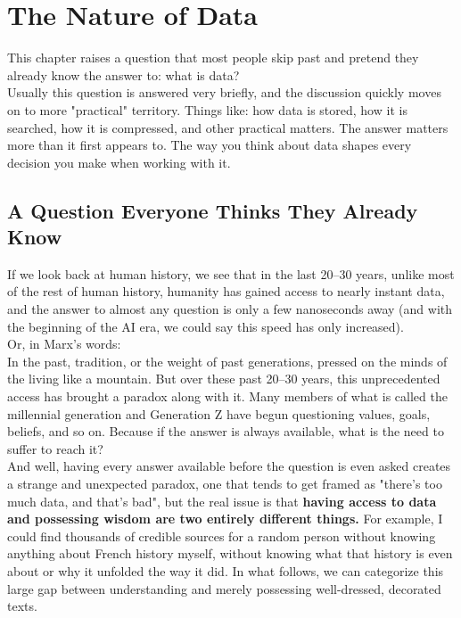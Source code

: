 \chapter{The Nature of Data}
\label{ch:nature-of-data}

This chapter raises a question that most people skip past and pretend they already know the answer to: what is data?\\
Usually this question is answered very briefly, and the discussion quickly moves on to more "practical" territory. Things like:
how data is stored, how it is searched, how it is compressed, and other practical matters\autocite{knuth1997,shannon1948,pierce2002}. The answer matters more than it first appears to. The way you think about data shapes every decision you make when working with it.
\newpage
\section{A Question Everyone Thinks They Already Know}
\label{sec:question-everyone-thinks-they-know}

If we look back at human history, we see that in the last 20--30 years, unlike most of the rest of human history, humanity has gained access to nearly instant data, and the answer to almost any question is only a few nanoseconds away (and with the beginning of the AI era, we could say this speed has only increased).\\
Or, in Marx's words:\\
In the past, tradition, or the weight of past generations, pressed on the minds of the living like a mountain\autocite{marx1852}. But over these past 20--30 years, this unprecedented access has brought a paradox along with it. Many members of what is called the millennial generation and Generation Z have begun questioning values, goals, beliefs, and so on. Because if the answer is always available, what is the need to suffer to reach it?\\
And well, having every answer available before the question is even asked creates a strange and unexpected paradox, one that tends to get framed as "there's too much data, and that's bad", but the real issue is that \textbf{having access to data and possessing wisdom are two entirely different things.} For example, I could find thousands of credible sources for a random person without knowing anything about French history myself, without knowing what that history is even about or why it unfolded the way it did. In what follows, we can categorize this large gap between understanding and merely possessing well-dressed, decorated texts.

